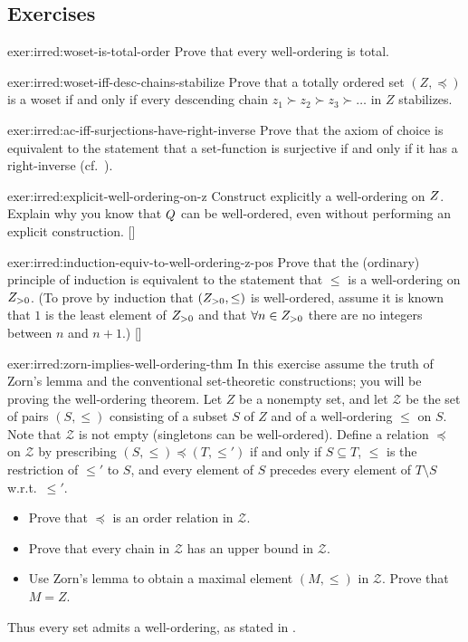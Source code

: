 \subsection*{Exercises}
\begin{exer}{}{exer:irred:woset-is-total-order}
  Prove that every well-ordering is total.
\end{exer}
\begin{exer}{}{exer:irred:woset-iff-desc-chains-stabilize}
  Prove that a totally ordered set $(Z, \preceq)$ is a woset if and
  only if every descending chain $z_1 \succ z_2 \succ z_3 \succ \dots$
  in $Z$ stabilizes.
\end{exer}
\begin{exer}{}{exer:irred:ac-iff-surjections-have-right-inverse}
  Prove that the axiom of choice is equivalent to the statement that a
  set-function is surjective if and only if it has a right-inverse
  (cf.\ ).
\end{exer}
\begin{exer}{}{exer:irred:explicit-well-ordering-on-z}
  \exerused{} Construct explicitly a well-ordering on $Z$. Explain
  why you know that $Q$ can be well-ordered, even without performing
  an explicit
  construction. []
\end{exer}
\begin{exer}{}{exer:irred:induction-equiv-to-well-ordering-z-pos}
  \exerused{} Prove that the (ordinary) principle of induction is
  equivalent to the statement that $\leq$ is a well-ordering on
  $Z_{>0}$.  (To prove by induction that $(Z_{>0}, \leq)$ is
  well-ordered, assume it is known that $1$ is the least element of
  $Z_{>0}$ and that $\forall n \in Z_{>0}$ there are no integers
  between $n$ and $n+1$.) []
\end{exer}
\begin{exer}{}{exer:irred:zorn-implies-well-ordering-thm}
  In this exercise assume the truth of Zorn's lemma and the
  conventional set-theoretic constructions; you will be proving the
  well-ordering theorem. Let $Z$ be a nonempty set, and let
  $\mathscr{Z}$ be the set of pairs $(S, \leq)$ consisting of a subset
  $S$ of $Z$ and of a well-ordering $\leq$ on $S$. Note that
  $\mathscr{Z}$ is not empty (singletons can be well-ordered). Define
  a relation $\preceq$ on $\mathscr{Z}$ by prescribing
  $(S, \leq) \preceq (T, \leq')$ if and only if $S \subseteq T$,
  $\leq$ is the restriction of $\leq'$ to $S$, and every element of
  $S$ precedes every element of $T \setminus S$ w.r.t.\ $\leq'$.
  \begin{itemize}
  \item Prove that $\preceq$ is an order relation in $\mathscr{Z}$.
  \item Prove that every chain in $\mathscr{Z}$ has an upper bound in
    $\mathscr{Z}$.
  \item Use Zorn's lemma to obtain a maximal element $(M, \leq)$ in
    $\mathscr{Z}$. Prove that $M = Z$.
  \end{itemize}
  Thus every set admits a well-ordering, as stated in
  .
\end{exer}

